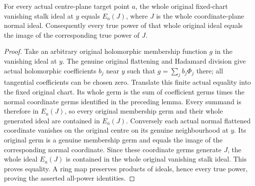\begin{theorem}
\label{hir:nearby-centre-whole-original-vanishing-ideal}
\leanok
For every actual centre-plane target point $a$, the whole original
fixed-chart vanishing stalk ideal at $y$ equals $E_a(J)$, where $J$
is the whole coordinate-plane normal ideal. Consequently every true
power of that whole original ideal equals the image of the
corresponding true power of $J$.
\end{theorem}
\begin{proof}
Take an arbitrary original holomorphic membership function $g$ in the
vanishing ideal at $y$. The genuine original flattening and Hadamard
division give actual holomorphic coefficients $b_j$ near $y$ such that
$g=\sum_j b_j\Phi_j$ there; all tangential coefficients can be chosen
zero. Translate this finite actual equality into the fixed original
chart. Its whole germ is the sum of coefficient germs times the normal
coordinate germs identified in the preceding lemma. Every summand is
therefore in $E_a(J)$, so every original membership germ and their
whole generated ideal are contained in $E_a(J)$.
Conversely each actual normal flattened coordinate vanishes on the
original centre on its genuine neighbourhood at $y$. Its original
germ is a genuine membership germ and equals the image of the
corresponding normal coordinate. Since these coordinate germs
generate $J$, the whole ideal $E_a(J)$ is contained in the whole
original vanishing stalk ideal. This proves equality. A ring map
preserves products of ideals, hence every true power, proving the
asserted all-power identities.
\end{proof}

